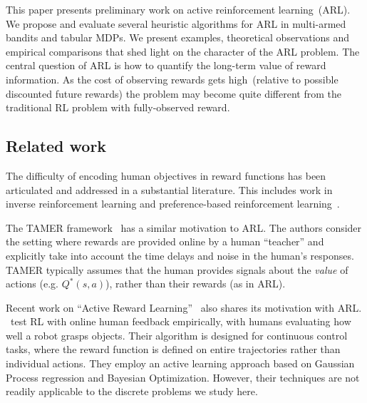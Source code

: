 \documentclass{article}
\begin{document}
This paper presents preliminary work on active reinforcement learning~(ARL). 
We propose and evaluate several heuristic algorithms for ARL in multi-armed bandits and tabular MDPs. 
We present examples, theoretical observations and empirical comparisons that shed light on the character of the ARL problem. 
The central question of ARL is how to quantify the long-term value of reward information. 
As the cost of observing rewards gets high~(relative to possible discounted future rewards) the problem may become quite different from the traditional RL problem with fully-observed reward. 

\subsection{Related work}

The difficulty of encoding human objectives in reward functions has been articulated and addressed in a substantial literature. 
This includes work in inverse reinforcement learning \citep{ng2000algorithms, evans2015learning} and preference-based reinforcement learning~\citep{wirth2013preference}. 

The TAMER framework~\citep{knox2009interactively} has a similar motivation to ARL.
The authors consider the setting where rewards are provided online by a human ``teacher'' and explicitly take into account the time delays and noise in the human's responses. TAMER typically assumes that the human provides signals about the {\em value} of actions (e.g. $Q^*(s,a)$), rather than their rewards (as in ARL).

Recent work on ``Active Reward Learning''~\citep{DanielVMKP2014} also shares its motivation with ARL.
\citeauthor{DanielVMKP2014}\ test RL with online human feedback empirically, with humans evaluating how well a robot grasps objects.
Their algorithm is designed for continuous control tasks, where the reward function is defined on entire trajectories rather than individual actions.
They employ an active learning approach based on Gaussian Process regression and Bayesian Optimization.
However, their techniques are not readily applicable to the discrete problems we study here. 
\end{document}
